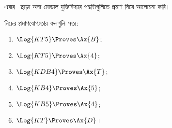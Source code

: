 \documentclass[../../../include/open-logic-section]{subfiles}
\begin{document}


এবার~ ছাড়া অন্য মোডাল যুক্তিবিদ্যার পদ্ধতিগুলিতে প্রমাণ নিয়ে আলোচনা করি।

\begin{prop}
নিচের প্রমাণযোগ্যতার ফলগুলি সত্য:
  \begin{enumerate}
  \item $\Log{KT5} \Proves \Ax{B}$;
  \item $\Log{KT5} \Proves \Ax{4}$;
  \item $\Log{KDB4} \Proves \Ax{T}$;
  \item $\Log{KB4} \Proves \Ax{5}$;
  \item $\Log{KB5} \Proves \Ax{4}$;
  \item {}$\Log{KT} \Proves \Ax{D}$।
  \end{enumerate}
\end{prop}
\end{document}
